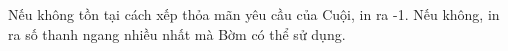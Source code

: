 Nếu không tồn tại cách xếp thỏa mãn yêu cầu của Cuội, in ra -1. Nếu không, in ra số thanh ngang nhiều nhất mà Bờm có thể sử dụng.